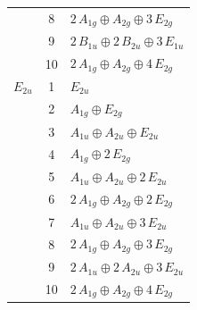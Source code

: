 \documentclass[11pt]{article}
\begin{document}
\begin{longtable}{l c p{}}
 & 8 & $2\,A_{1g}\oplus A_{2g}\oplus 3\,E_{2g}$\\
 & 9 & $2\,B_{1u}\oplus 2\,B_{2u}\oplus 3\,E_{1u}$\\
 & 10 & $2\,A_{1g}\oplus A_{2g}\oplus 4\,E_{2g}$\\
\hline
$E_{2u}$ & 1 & $E_{2u}$\\
 & 2 & $A_{1g}\oplus E_{2g}$\\
 & 3 & $A_{1u}\oplus A_{2u}\oplus E_{2u}$\\
 & 4 & $A_{1g}\oplus 2\,E_{2g}$\\
 & 5 & $A_{1u}\oplus A_{2u}\oplus 2\,E_{2u}$\\
 & 6 & $2\,A_{1g}\oplus A_{2g}\oplus 2\,E_{2g}$\\
 & 7 & $A_{1u}\oplus A_{2u}\oplus 3\,E_{2u}$\\
 & 8 & $2\,A_{1g}\oplus A_{2g}\oplus 3\,E_{2g}$\\
 & 9 & $2\,A_{1u}\oplus 2\,A_{2u}\oplus 3\,E_{2u}$\\
 & 10 & $2\,A_{1g}\oplus A_{2g}\oplus 4\,E_{2g}$\\
\hline
\end{longtable}
\end{document}
